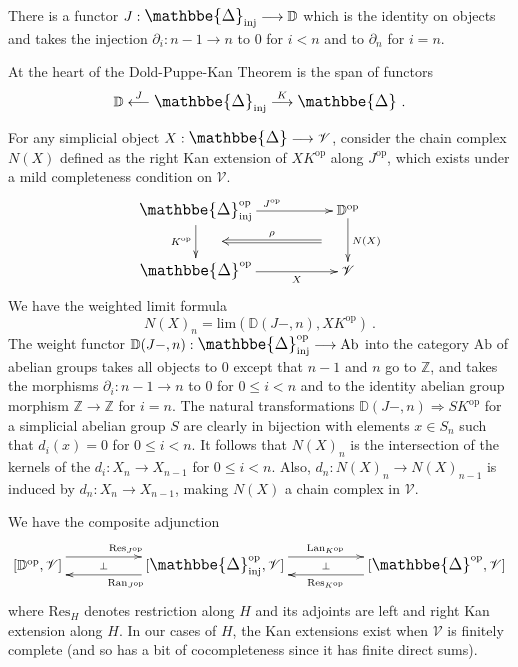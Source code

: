 \documentclass[a4paper,12pt,reqno]{amsart}
\def\makebigger#1#2#3{\hbox{#1$\mathsurround=0pt #2{#3}$}}
\def\bigger#1#2{{\relax\mathpalette{\makebigger#1}{#2}}}
\newcommand{\DelCat}{{\bigger\large{\mathbbe{\Delta}}}}
\theoremstyle{definition}
\theoremstyle{fact}
\theoremstyle{genquest}
\theoremstyle{step}
\newcommand{\lra}{\longrightarrow}
\newcommand{\lla}{\longleftarrow}
\newcommand{\Lra}{\Longrightarrow}
\def\CV{{\mathscr V}}
\begin{document}
There is a functor $J: \DelCat_{\mathrm{inj}} \lra \mathbb{D}$ which
is the identity on objects and takes the injection $\partial_i : n-1\lra n$
to $0$ for $i<n$ and to $\partial_n$ for $i=n$.

At the heart of the Dold-Puppe-Kan Theorem is the span of functors
$$\mathbb{D}\stackrel{J}\lla \DelCat_{\mathrm{inj}}\stackrel{K}\lra \DelCat \ .$$ 

For any simplicial object $X: \DelCat\lra \CV$, consider the
chain complex $N(X)$ defined as the right Kan extension of 
$X K^{\mathrm{op}}$ along $J^{\mathrm{op}}$, 
which exists under a mild completeness condition on $\CV$.
\begin{equation}
\begin{aligned}
\xymatrix{
\DelCat_{\mathrm{inj}}^{\mathrm{op}} \ar[d]_{K^{\mathrm{op}}}^(0.5){\phantom{aaa}}="1" \ar[rr]^{J^{\mathrm{op}}}  && \mathbb{D}^{\mathrm{op}}  \ar[d]^{N(X)}_(0.5){\phantom{aaa}}="2" \ar@{<=}"1";"2"^-{\rho}
\\
\DelCat^{\mathrm{op}}  \ar[rr]_-{X} && \CV 
}
\end{aligned}
\end{equation} 
We have the weighted limit formula
$$N(X)_n=\mathrm{lim}(\mathbb{D}(J-,n),XK^{\mathrm{op}}) \ .$$
The weight functor $\mathbb{D}(J-,n): \DelCat_{\mathrm{inj}}^{\mathrm{op}} \lra \mathrm{Ab}$
into the category $\mathrm{Ab}$ of abelian groups takes all objects to $0$
except that $n-1$ and $n$ go to $\mathbb{Z}$, and takes the morphisms
$\partial_i : n-1\lra n$ to $0$ for $0\le i <n$ and to the identity abelian group morphism $\mathbb{Z}\lra \mathbb{Z}$ for $i=n$. 
The natural transformations $\mathbb{D}(J-,n) \Lra SK^{\mathrm{op}}$ 
for a simplicial abelian group $S$ are clearly in bijection with elements
$x\in S_n$ such that $d_i(x) = 0$ for $0\le i < n$. 
It follows that $N(X)_n$ is the intersection of the kernels of the 
$d_i: X_n\lra X_{n-1}$ for $0\le i < n$.
Also, $d_n : N(X)_n\lra N(X)_{n-1}$ is induced by $d_n : X_n\lra X_{n-1}$,
making $N(X)$ a chain complex in $\CV$.    

We have the composite adjunction
\[ \xymatrix @R-3mm {
[\mathbb{D}^{\mathrm{op}},\CV] \ar@<1.5ex>[rr]^{\mathrm{Res}_{J^{\mathrm{op}}}} \ar@{}[rr]|-{\perp} && [\DelCat_{\mathrm{inj}}^{\mathrm{op}},\CV] \ar@<1.5ex>[ll]^{\mathrm{Ran}_{J^{\mathrm{op}}}} \ar@<1.5ex>[rr]^{\mathrm{Lan}_{K^{\mathrm{op}}}} \ar@{}[rr]|-{\perp} && [\DelCat^{\mathrm{op}},\CV] \ar@<1.5ex>[ll]^{\mathrm{Res}_{K^{\mathrm{op}}}} 
}\]
where $\mathrm{Res}_{H}$ denotes restriction along $H$ and its adjoints are
left and right Kan extension along $H$. In our cases of $H$, the Kan extensions
exist when $\CV$ is finitely complete (and so has a bit of cocompleteness since
it has finite direct sums).
\end{document}
